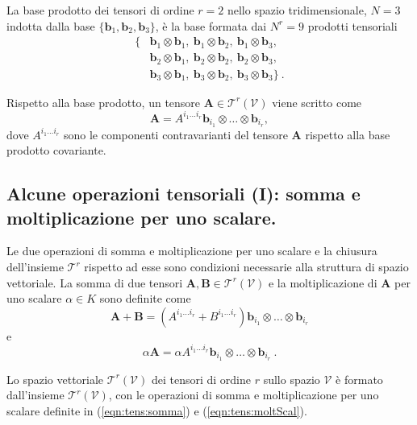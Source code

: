 \begin{example}
 La base prodotto dei tensori di ordine $r=2$ nello spazio tridimensionale, $N=3$ indotta dalla base $\{ \bm{b}_1, \bm{b}_2, \bm{b}_3 \}$, è la base formata dai $N^r = 9$ prodotti tensoriali
\begin{equation}
\begin{aligned}
 \{ & \bm{b}_1 \otimes \bm{b}_1 , \  \bm{b}_1 \otimes \bm{b}_2 , \  \bm{b}_1 \otimes \bm{b}_3 , \\
    & \bm{b}_2 \otimes \bm{b}_1 , \  \bm{b}_2 \otimes \bm{b}_2 , \  \bm{b}_2 \otimes \bm{b}_3 , \\
    & \bm{b}_3 \otimes \bm{b}_1 , \  \bm{b}_3 \otimes \bm{b}_2 , \  \bm{b}_3 \otimes \bm{b}_3  \} \ .
\end{aligned}
\end{equation}
\end{example}

\noindent
 Rispetto alla base prodotto, un tensore $\bm{A} \in \mathcal{T}^r(\mathcal{V})$ viene scritto come
 \begin{equation}
  \bm{A} = A^{i_1 \dots i_r} \bm{b}_{i_1} \otimes \dots \otimes \bm{b}_{i_r} ,
 \end{equation}
 dove $A^{i_1 \dots i_r}$ sono le componenti contravarianti del tensore $\bm{A}$ rispetto alla base prodotto covariante.

 \subsection{Alcune operazioni tensoriali (I): somma e moltiplicazione per uno scalare.}\label{ch:tensori:operazioniI}
 Le due operazioni di somma e moltiplicazione per uno scalare e la chiusura dell'insieme $\mathcal{T}^r$ rispetto ad esse sono condizioni necessarie alla struttura di spazio vettoriale. La somma di due tensori $\bm{A},\bm{B} \in \mathcal{T}^r(\mathcal{V})$ e la moltiplicazione di $\bm{A}$ per uno scalare $\alpha \in K$ sono definite come
\begin{equation}\label{eqn:tens:somma}
 \bm{A}+\bm{B} = 
    ( A^{i_1 \dots i_r} + B^{i_1 \dots i_r}  ) \bm{b}_{i_1} \otimes \dots \otimes \bm{b}_{i_r}
\end{equation}
 e
\begin{equation}\label{eqn:tens:moltScal}
  \alpha \bm{A} = 
    \alpha A^{i_1 \dots i_r} \bm{b}_{i_1} \otimes \dots \otimes \bm{b}_{i_r} \ .
\end{equation}
%
\vspace{15pt}
\begin{definition} Lo spazio vettoriale $\mathcal{T}^r(\mathcal{V})$ dei tensori di ordine $r$ sullo spazio $\mathcal{V}$ è formato dall'insieme $\mathcal{T}^r(\mathcal{V})$, con le operazioni di somma e moltiplicazione per uno scalare definite in (\ref{eqn:tens:somma}) e (\ref{eqn:tens:moltScal}).
\end{definition}



